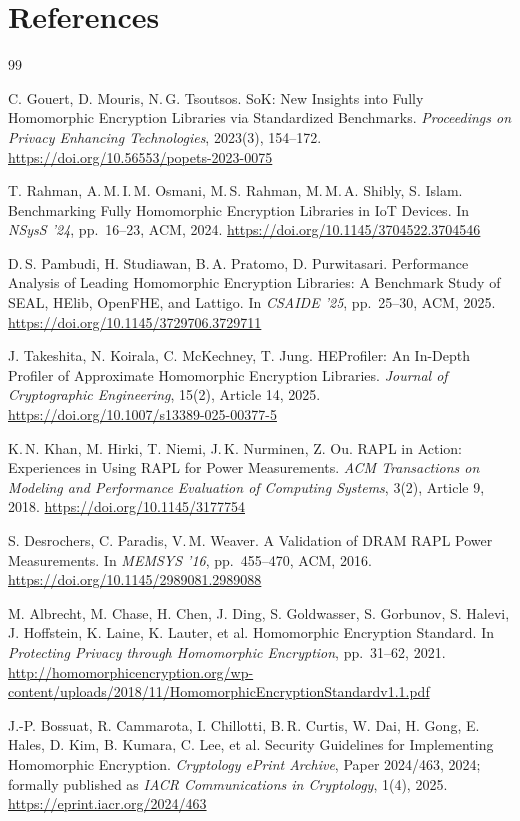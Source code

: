 \newpage
\section*{References}
\begin{thebibliography}{99}
\small

 C. Gouert, D. Mouris, N.\,G. Tsoutsos. SoK: New Insights into Fully Homomorphic Encryption Libraries via Standardized Benchmarks. \emph{Proceedings on Privacy Enhancing Technologies}, 2023(3), 154--172. \url{https://doi.org/10.56553/popets-2023-0075}

 T. Rahman, A.\,M.\,I.\,M. Osmani, M.\,S. Rahman, M.\,M.\,A. Shibly, S. Islam. Benchmarking Fully Homomorphic Encryption Libraries in IoT Devices. In \emph{NSysS '24}, pp.\ 16--23, ACM, 2024. \url{https://doi.org/10.1145/3704522.3704546}

 D.\,S. Pambudi, H. Studiawan, B.\,A. Pratomo, D. Purwitasari. Performance Analysis of Leading Homomorphic Encryption Libraries: A Benchmark Study of SEAL, HElib, OpenFHE, and Lattigo. In \emph{CSAIDE '25}, pp.\ 25--30, ACM, 2025. \url{https://doi.org/10.1145/3729706.3729711}

 J. Takeshita, N. Koirala, C. McKechney, T. Jung. HEProfiler: An In-Depth Profiler of Approximate Homomorphic Encryption Libraries. \emph{Journal of Cryptographic Engineering}, 15(2), Article 14, 2025. \url{https://doi.org/10.1007/s13389-025-00377-5}

 K.\,N. Khan, M. Hirki, T. Niemi, J.\,K. Nurminen, Z. Ou. RAPL in Action: Experiences in Using RAPL for Power Measurements. \emph{ACM Transactions on Modeling and Performance Evaluation of Computing Systems}, 3(2), Article 9, 2018. \url{https://doi.org/10.1145/3177754}

 S. Desrochers, C. Paradis, V.\,M. Weaver. A Validation of DRAM RAPL Power Measurements. In \emph{MEMSYS '16}, pp.\ 455--470, ACM, 2016. \url{https://doi.org/10.1145/2989081.2989088}

 M. Albrecht, M. Chase, H. Chen, J. Ding, S. Goldwasser, S. Gorbunov, S. Halevi, J. Hoffstein, K. Laine, K. Lauter, et al. Homomorphic Encryption Standard. In \emph{Protecting Privacy through Homomorphic Encryption}, pp.\ 31--62, 2021. \url{http://homomorphicencryption.org/wp-content/uploads/2018/11/HomomorphicEncryptionStandardv1.1.pdf}

 J.-P. Bossuat, R. Cammarota, I. Chillotti, B.\,R. Curtis, W. Dai, H. Gong, E. Hales, D. Kim, B. Kumara, C. Lee, et al. Security Guidelines for Implementing Homomorphic Encryption. \emph{Cryptology ePrint Archive}, Paper 2024/463, 2024; formally published as \emph{IACR Communications in Cryptology}, 1(4), 2025. \url{https://eprint.iacr.org/2024/463}


\end{thebibliography}
